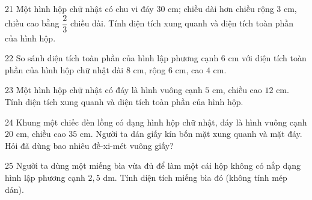 \gap
\begin{probbox}{21}{\relax}
Một hình hộp chữ nhật có chu vi đáy $30$ cm; chiều dài hơn chiều rộng $3$ cm, chiều cao bằng $\dfrac23$ chiều dài. Tính diện tích xung quanh và diện tích toàn phần của hình hộp.
\end{probbox}
\gap
\begin{probbox}{22}{\relax}
So sánh diện tích toàn phần của hình lập phương cạnh $6$ cm với diện tích toàn phần của hình hộp chữ nhật dài $8$ cm, rộng $6$ cm, cao $4$ cm.
\end{probbox}
\gap
\begin{probbox}{23}{\relax}
Một hình hộp chữ nhật có đáy là hình vuông cạnh $5$ cm, chiều cao $12$ cm. Tính diện tích xung quanh và diện tích toàn phần của hình hộp.
\end{probbox}
\gap
\begin{probbox}{24}{\relax}
Khung một chiếc đèn lồng có dạng hình hộp chữ nhật, đáy là hình vuông cạnh $20$ cm, chiều cao $35$ cm. Người ta dán giấy kín bốn mặt xung quanh và mặt đáy. Hỏi đã dùng bao nhiêu đề-xi-mét vuông giấy?
\end{probbox}
\gap
\begin{probbox}{25}{\relax}
Người ta dùng một miếng bìa vừa đủ để làm một cái hộp không có nắp dạng hình lập phương cạnh $2{,}5$ dm. Tính diện tích miếng bìa đó (không tính mép dán).
\end{probbox}

